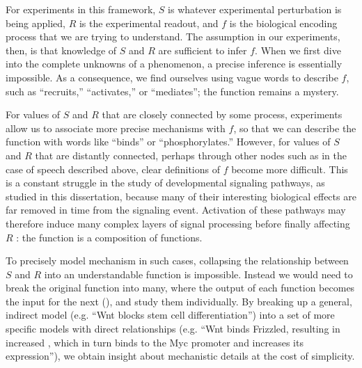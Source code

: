 For experiments in this framework, $S$ is whatever
experimental perturbation is being applied, $R$ is the
experimental readout, and $f$ is the biological encoding process that
we are trying to understand. The assumption in our experiments,
then, is that knowledge of $S$ and $R$ are sufficient to infer
$f$. When we first dive into the complete unknowns of a
phenomenon, a precise inference is essentially impossible.
As a consequence, we find ourselves using vague
words to describe $f$, such as ``recruits,'' ``activates,''
or ``mediates''; the function remains a mystery.


For values of $S$ and $R$ that are
closely connected by some process, experiments allow us
to associate more precise
mechanisms with $f$, so that we can describe the function with words like ``binds''
or ``phosphorylates.'' However, for values of $S$ and $R$
that are distantly connected, perhaps through other nodes such as in the 
case of speech described above,
clear definitions of $f$ become more difficult. This
is a constant struggle in the study of developmental signaling pathways,
as studied in this dissertation, because many of their
interesting biological effects are far removed in time from the
signaling event. Activation of these pathways may therefore
induce many complex layers of signal processing before finally affecting $R$
: the function is a composition of functions.


To precisely model mechanism in such cases, collapsing the
relationship between $S$ and $R$ into an understandable function is impossible.
Instead we would need to break the original function into many, where
the output of each function becomes the input for the next
(), and study them individually.
By breaking up a general, indirect model (e.g. ``Wnt blocks
stem cell differentiation'') into a set of more specific models with direct
relationships (e.g. ``Wnt binds Frizzled, resulting in
increased \bcat, which in turn binds to the Myc promoter and
increases its expression''), we obtain insight about mechanistic details
at the cost of simplicity.


